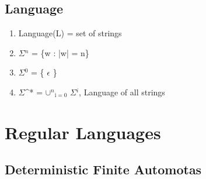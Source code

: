 \documentclass[11pt]{article}
\begin{document}
\subsection{Language}
\label{sec-1.3}

\begin{enumerate}
\item Language(L) = set of strings
\item $\Sigma$$^n$ = \{w : |w| = n\}
\item $\Sigma$$^0$ = \{ $\epsilon$ \}
\item $\Sigma$^* = $\cup$$^n$$_{\mathrm{i=0}}$ $\Sigma$$^i$, Language of all strings
\end{enumerate}
\section{Regular Languages}
\label{sec-2}

\subsection{Deterministic Finite Automotas}
\label{sec-2.1}
\end{document}
